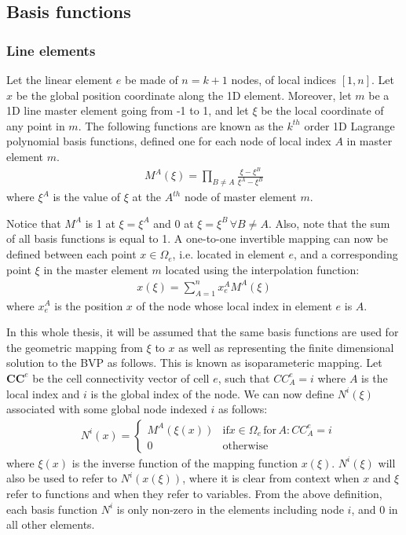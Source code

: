 \subsection{Basis functions}

	\subsubsection{Line elements}

	Let the linear element $e$ be made of $n = k + 1$ nodes, of local indices $[1,n]$. Let $x$ be the global position coordinate along the 1D element. Moreover, let $m$ be a 1D line master element going from -1 to 1, and let $\xi$ be the local coordinate of any point in $m$. The following functions are known as the $k^{th}$ order 1D Lagrange polynomial basis functions, defined one for each node of local index $A$ in master element $m$.
	\begin{align}
		M^{A}(\xi) = \prod_{B \neq A}\frac{\xi - \xi^{B}}{\xi^{A} - \xi^{B}}
	\end{align}
	where $\xi^A$ is the value of $\xi$ at the $A^{th}$ node of master element $m$.

	Notice that $M^{A}$ is 1 at $\xi = \xi^{A}$ and 0 at $\xi = \xi^{B} \, \forall B \neq A$. Also, note that the sum of all basis functions is equal to 1. A one-to-one invertible mapping can now be defined between each point $x \in \Omega_e$, i.e. located in element $e$, and a corresponding point $\xi$ in the master element $m$ located using the interpolation function:
	\begin{align}
	    x(\xi) = \sum_{A=1}^{n} x^A_e M^{A}(\xi)
	\end{align}
	where $x^A_e$ is the position $x$ of the node whose local index in element $e$ is $A$.
	
	In this whole thesis, it will be assumed that the same basis functions are used for the geometric mapping from $\xi$ to $x$ as well as representing the finite dimensional solution to the BVP as follows. This is known as isoparameteric mapping. Let $\bm{CC}^e$ be the cell connectivity vector of cell $e$, such that $CC^e_A = i$ where $A$ is the local index and $i$ is the global index of the node. We can now define $N^i(\xi)$ associated with some global node indexed $i$ as follows:
	\begin{align}
		& N^i(x) = \begin{cases}
			M^{A}(\xi(x)) & \text{if} x \in \Omega_e \, \text{for} \, A: CC^e_A = i\\
			0 & \text{otherwise}
		\end{cases}
	\end{align}
	where $\xi(x)$ is the inverse function of the mapping function $x(\xi)$. $N^i(\xi)$ will also be used to refer to $N^i(x(\xi))$, where it is clear from context when $x$ and $\xi$ refer to functions and when they refer to variables. From the above definition, each basis function $N^i$ is only non-zero in the elements including node $i$, and 0 in all other elements.
	
